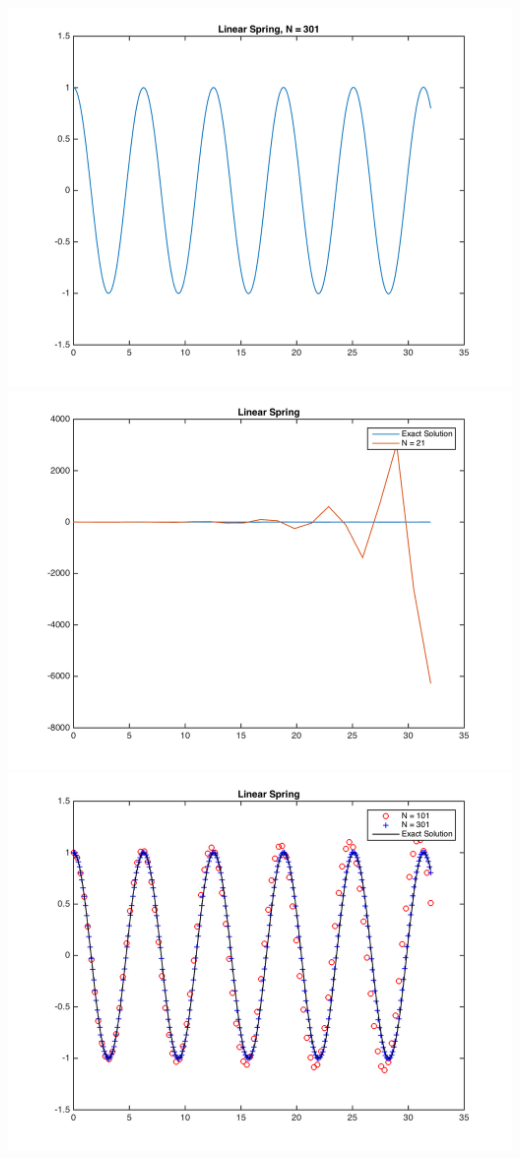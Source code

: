\documentclass[11pt, oneside]{article}
\begin{document}
\begin{enumerate}
\begin{center}
        \includegraphics[scale=.4]{Figures/01_03.png}
        \includegraphics[scale=.4]{Figures/01_04.png}
        \includegraphics[scale=.7]{Figures/01_05.png}
      \end{center}


\end{enumerate}
\end{document}
